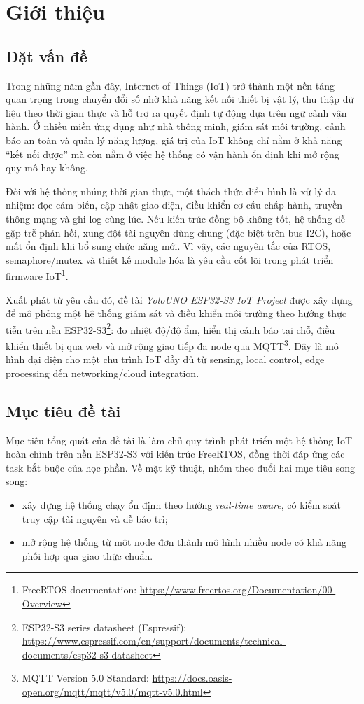﻿\newpage
\section{Giới thiệu}

\subsection{Đặt vấn đề}

Trong những năm gần đây, Internet of Things (IoT) trở thành một nền tảng quan trọng trong chuyển đổi số nhờ khả năng kết nối thiết bị vật lý, thu thập dữ liệu theo thời gian thực và hỗ trợ ra quyết định tự động dựa trên ngữ cảnh vận hành. Ở nhiều miền ứng dụng như nhà thông minh, giám sát môi trường, cảnh báo an toàn và quản lý năng lượng, giá trị của IoT không chỉ nằm ở khả năng ``kết nối được'' mà còn nằm ở việc hệ thống có vận hành ổn định khi mở rộng quy mô hay không.

Đối với hệ thống nhúng thời gian thực, một thách thức điển hình là xử lý đa nhiệm: đọc cảm biến, cập nhật giao diện, điều khiển cơ cấu chấp hành, truyền thông mạng và ghi log cùng lúc. Nếu kiến trúc đồng bộ không tốt, hệ thống dễ gặp trễ phản hồi, xung đột tài nguyên dùng chung (đặc biệt trên bus I2C), hoặc mất ổn định khi bổ sung chức năng mới. Vì vậy, các nguyên tắc của RTOS, semaphore/mutex và thiết kế module hóa là yêu cầu cốt lõi trong phát triển firmware IoT\footnote{FreeRTOS documentation: \url{https://www.freertos.org/Documentation/00-Overview}}.

Xuất phát từ yêu cầu đó, đề tài \textit{YoloUNO ESP32-S3 IoT Project} được xây dựng để mô phỏng một hệ thống giám sát và điều khiển môi trường theo hướng thực tiễn trên nền ESP32-S3\footnote{ESP32-S3 series datasheet (Espressif): \url{https://www.espressif.com/en/support/documents/technical-documents/esp32-s3-datasheet}}: đo nhiệt độ/độ ẩm, hiển thị cảnh báo tại chỗ, điều khiển thiết bị qua web và mở rộng giao tiếp đa node qua MQTT\footnote{MQTT Version 5.0 Standard: \url{https://docs.oasis-open.org/mqtt/mqtt/v5.0/mqtt-v5.0.html}}. Đây là mô hình đại diện cho một chu trình IoT đầy đủ từ sensing, local control, edge processing đến networking/cloud integration.

\subsection{Mục tiêu đề tài}

Mục tiêu tổng quát của đề tài là làm chủ quy trình phát triển một hệ thống IoT hoàn chỉnh trên nền ESP32-S3 với kiến trúc FreeRTOS, đồng thời đáp ứng các task bắt buộc của học phần. Về mặt kỹ thuật, nhóm theo đuổi hai mục tiêu song song:
\begin{itemize}
    \item xây dựng hệ thống chạy ổn định theo hướng \textit{real-time aware}, có kiểm soát truy cập tài nguyên và dễ bảo trì;
    \item mở rộng hệ thống từ một node đơn thành mô hình nhiều node có khả năng phối hợp qua giao thức chuẩn.
\end{itemize}

